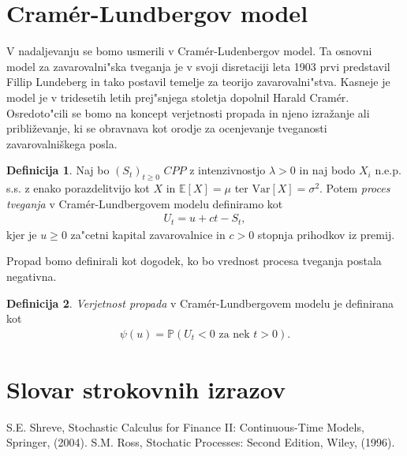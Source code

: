 \documentclass[12pt, a4paper, reqno]{amsart}
\theoremstyle{definition} %
\newtheorem{definicija}{Definicija}[section]
\theoremstyle{plain} %
\newcommand{\geslo}[2]{\noindent\textbf{#1}\hspace*{3mm}\hangindent=\parindent\hangafter=1 #2}
\newcommand{\E}{\mathbb{E}}
\newcommand{\Prob}{\mathbb{P}}
\newcommand{\1}{\mathds{1}}
\newcommand{\Var}[1]{\text{Var}\left[#1\right]}
\begin{document}
\section{Cramér-Lundbergov model}
    V nadaljevanju se bomo usmerili v Cramér-Ludenbergov model. Ta osnovni model za zavarovalni"ska
    tveganja je v svoji disretaciji leta 1903 prvi predstavil Fillip Lundeberg in tako postavil temelje
    za teorijo zavarovalni"stva. Kasneje je model je v tridesetih letih prej"snjega stoletja dopolnil 
    Harald Cramér. Osredoto"cili se bomo na koncept verjetnosti propada in njeno izražanje ali približevanje,
    ki se obravnava kot orodje za ocenjevanje tveganosti zavarovalniškega posla.

    \begin{definicija}
        Naj bo $(S_t)_{t\geq0}$ $CPP$ z intenzivnostjo $\lambda > 0$ in naj bodo $X_i$ n.e.p. s.s.
        z enako porazdelitvijo kot $X$ in $\E\left[X\right] = \mu$ ter $\Var{X} = \sigma^2$. Potem 
        \textit{proces tveganja} v Cramér-Lundbergovem modelu definiramo kot
        \begin{align*}
            U_t = u + ct - S_t,
        \end{align*}
        kjer je $u \geq 0$ za"cetni kapital zavarovalnice in $c>0$ stopnja prihodkov iz premij. 
        \label{def:procesTveganja}
    \end{definicija}

    Propad bomo definirali kot dogodek, ko bo vrednost procesa tveganja postala negativna.

    \begin{definicija}
        \textit{Verjetnost propada} v Cramér-Lundbergovem modelu je definirana kot
        \begin{align*}
            \psi(u) = \Prob(U_t < 0 \text{ za nek } t > 0).
        \end{align*}
        \label{def:verjetnostPropada}
    \end{definicija}

















\section*{Slovar strokovnih izrazov}

%
%


\begin{thebibliography}{99}

S.E. Shreve, Stochastic Calculus for Finance II: Continuous-Time Models, Springer, (2004).
S.M. Ross, Stochatic Processes: Second Edition, Wiley, (1996).
\end{thebibliography}
\end{document}
